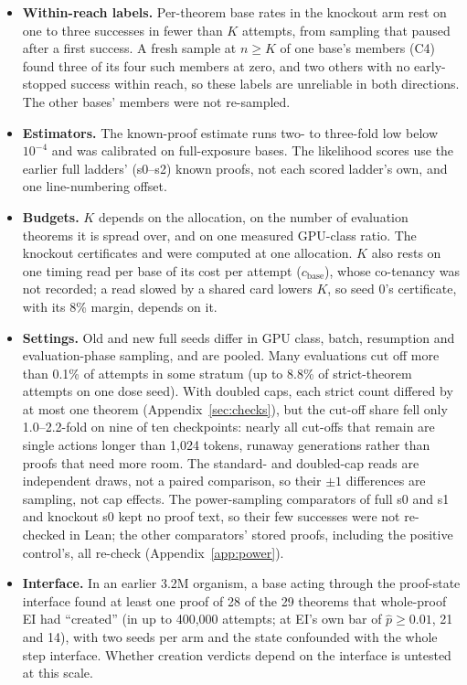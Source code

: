 \begin{itemize}
others the bases sit at the sampling floor.
\item \textbf{Within-reach labels.} Per-theorem base rates in the knockout arm rest on one to three successes in fewer
than $K$ attempts, from sampling that paused after a first success. A fresh sample at $n \geq K$ of one base's members
(C4) found three of its four such members at zero, and two others with no early-stopped success within reach, so
these labels are unreliable in both directions. The other bases' members were not
re-sampled.
\item \textbf{Estimators.} The known-proof estimate runs two- to three-fold low below $10^{-4}$ and was calibrated on
full-exposure bases. The likelihood scores use the earlier full ladders' (s0--s2) known proofs, not each scored ladder's own,
and one line-numbering offset.
\item \textbf{Budgets.} $K$ depends on the allocation, on the number of evaluation theorems it is spread over, and on
one measured GPU-class ratio. The knockout certificates and \dcov{} were computed at one allocation. $K$ also
rests on one timing read per base of its cost per attempt ($c_{\mathrm{base}}$), whose co-tenancy was not recorded; a
read slowed by a shared card lowers $K$, so seed 0's certificate, with its 8\% margin, depends on it.
\item \textbf{Settings.} Old and new full seeds differ in GPU class, batch, resumption and evaluation-phase sampling,
and are pooled. Many evaluations cut off more than 0.1\% of attempts in some stratum (up to 8.8\% of strict-theorem
attempts on one dose seed). With doubled caps, each strict count differed by at most one theorem (Appendix~\ref{sec:checks}), but the
cut-off share fell only 1.0--2.2-fold on nine of ten checkpoints: nearly all cut-offs that remain are single actions longer
than 1,024 tokens, runaway generations rather than proofs that need more room. The standard- and doubled-cap reads are
independent draws, not a paired comparison, so their $\pm1$ differences are sampling, not cap effects. The power-sampling comparators of full s0 and s1 and
knockout s0 kept no proof text, so their few successes were not re-checked in Lean; the other comparators' stored
proofs, including the positive control's, all re-check (Appendix~\ref{app:power}).
\item \textbf{Interface.} In an earlier 3.2M organism, a base acting through the proof-state interface found at
least one proof of 28 of the 29 theorems that whole-proof EI had ``created'' (in up to 400,000 attempts; at EI's own
bar of $\hat p \geq 0.01$, 21 and 14), with two seeds per arm and the state confounded with the whole step interface. Whether creation verdicts depend on the interface is untested at this scale.
\end{itemize}
